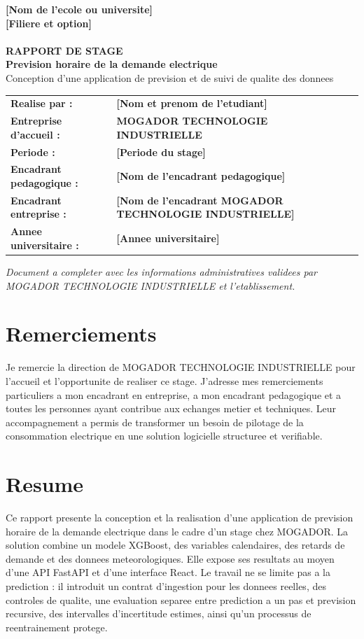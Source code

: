 \documentclass[12pt,a4paper,oneside]{report}
\newcommand{\Etablissement}{\textbf{[Nom de l'ecole ou universite]}}
\newcommand{\Filiere}{\textbf{[Filiere et option]}}
\newcommand{\Etudiant}{\textbf{[Nom et prenom de l'etudiant]}}
\newcommand{\Annee}{\textbf{[Annee universitaire]}}
\newcommand{\Periode}{\textbf{[Periode du stage]}}
\newcommand{\EncadrantEcole}{\textbf{[Nom de l'encadrant pedagogique]}}
\newcommand{\EncadrantEntreprise}{\textbf{[Nom de l'encadrant MOGADOR TECHNOLOGIE INDUSTRIELLE]}}
\begin{document}
\begin{titlepage}
\centering
\vspace*{1cm}
\Etablissement\\[0.4cm]
\Filiere\\[1.2cm]
\hfill
{}\\[1.6cm]
{\Large \textbf{RAPPORT DE STAGE}}\\[0.5cm]
{\LARGE \textbf{Prevision horaire de la demande electrique}}\\[0.3cm]
{\large Conception d'une application de prevision et de suivi de qualite des donnees}\\[1.2cm]
\begin{tabular}{@{}>{\raggedright\arraybackslash\bfseries}p{5cm}>{\raggedright\arraybackslash}p{8.4cm}@{}}
Realise par : & \Etudiant\\[0.25cm]
Entreprise d'accueil : & \textbf{MOGADOR TECHNOLOGIE INDUSTRIELLE}\\[0.25cm]
Periode : & \Periode\\[0.25cm]
Encadrant pedagogique : & \EncadrantEcole\\[0.25cm]
Encadrant entreprise : & \EncadrantEntreprise\\[0.25cm]
Annee universitaire : & \Annee
\end{tabular}
\vfill
\textit{Document a completer avec les informations administratives validees par MOGADOR TECHNOLOGIE INDUSTRIELLE et l'etablissement.}
\end{titlepage}

\chapter*{Remerciements}
Je remercie la direction de MOGADOR TECHNOLOGIE INDUSTRIELLE pour l'accueil et l'opportunite de realiser ce stage. J'adresse mes remerciements particuliers a mon encadrant en entreprise, a mon encadrant pedagogique et a toutes les personnes ayant contribue aux echanges metier et techniques. Leur accompagnement a permis de transformer un besoin de pilotage de la consommation electrique en une solution logicielle structuree et verifiable.

\chapter*{Resume}
Ce rapport presente la conception et la realisation d'une application de prevision horaire de la demande electrique dans le cadre d'un stage chez MOGADOR. La solution combine un modele XGBoost, des variables calendaires, des retards de demande et des donnees meteorologiques. Elle expose ses resultats au moyen d'une API FastAPI et d'une interface React. Le travail ne se limite pas a la prediction : il introduit un contrat d'ingestion pour les donnees reelles, des controles de qualite, une evaluation separee entre prediction a un pas et prevision recursive, des intervalles d'incertitude estimes, ainsi qu'un processus de reentrainement protege.
\end{document}
